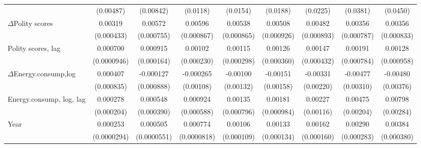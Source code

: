 \begin{table}[htbp]
\begin{tabular}{l*{8}{c}}
                    &   (0.00487)         &   (0.00842)         &    (0.0118)         &    (0.0154)         &    (0.0188)         &    (0.0225)         &    (0.0381)         &    (0.0450)         \\
[1em]
$\Delta$Polity scores            &     0.00319\sym{***}&     0.00572\sym{***}&     0.00596\sym{***}&     0.00538\sym{***}&     0.00508\sym{***}&     0.00482\sym{***}&     0.00356\sym{***}&     0.00356\sym{***}\\
                    &  (0.000433)         &  (0.000755)         &  (0.000867)         &  (0.000865)         &  (0.000926)         &  (0.000893)         &  (0.000787)         &  (0.000833)         \\
[1em]
Polity scores, lag              &    0.000700\sym{***}&    0.000915\sym{***}&     0.00102\sym{***}&     0.00115\sym{***}&     0.00126\sym{***}&     0.00147\sym{***}&     0.00191\sym{**} &     0.00128         \\
                    & (0.0000946)         &  (0.000164)         &  (0.000230)         &  (0.000298)         &  (0.000360)         &  (0.000432)         &  (0.000784)         &  (0.000958)         \\
[1em]
$\Delta$Energy.consump,log              &    0.000407         &   -0.000127         &   -0.000265         &    -0.00100         &    -0.00151         &    -0.00331         &    -0.00477         &    -0.00480         \\
                    &  (0.000835)         &  (0.000888)         &   (0.00108)         &   (0.00132)         &   (0.00158)         &   (0.00220)         &   (0.00310)         &   (0.00376)         \\
[1em]
Energy.consump, log, lag               &    0.000278         &    0.000548         &    0.000924         &     0.00135\sym{*}  &     0.00181\sym{*}  &     0.00227\sym{*}  &     0.00475\sym{**} &     0.00798\sym{***}\\
                    &  (0.000204)         &  (0.000390)         &  (0.000588)         &  (0.000796)         &  (0.000984)         &   (0.00116)         &   (0.00204)         &   (0.00284)         \\
[1em]
Year                &    0.000253\sym{***}&    0.000505\sym{***}&    0.000774\sym{***}&     0.00106\sym{***}&     0.00133\sym{***}&     0.00162\sym{***}&     0.00290\sym{***}&     0.00384\sym{***}\\
                    & (0.0000294)         & (0.0000551)         & (0.0000818)         &  (0.000109)         &  (0.000134)         &  (0.000160)         &  (0.000283)         &  (0.000380)         \\

\end{tabular}
\end{table}
